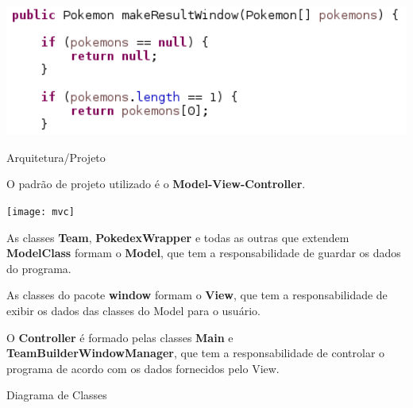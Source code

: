 \documentclass[
	article,			%
	12pt,				%
	oneside,			%
	a4paper,			%
	english,			%
	brazil,				%
	sumario=tradicional
	]{abntex2}
\begin{document}
\begin{center}
\includegraphics[width=1\textwidth]{tratamento_input2}\par
\end{center}



\newpage
\begin{center}
{\HUGE Arquitetura/Projeto}
\end{center}

O padrão de projeto utilizado é o \textbf{Model-View-Controller}.

\begin{center}
\texttt{[image: mvc]}\par
\end{center}

As classes \textbf{Team}, \textbf{PokedexWrapper} e todas as outras que extendem \textbf{ModelClass} formam o \textbf{Model}, que tem a responsabilidade de guardar os dados do programa.

As classes do pacote \textbf{window} formam o \textbf{View}, que tem a responsabilidade de exibir os dados das classes do Model para o usuário.

O \textbf{Controller} é formado pelas classes \textbf{Main} e \textbf{TeamBuilderWindowManager}, que tem a responsabilidade de controlar o programa de acordo com os dados fornecidos pelo View.

\newpage

\begin{center}
{\Large Diagrama de Classes}
\end{center}
\end{document}

